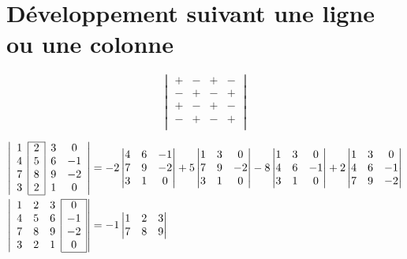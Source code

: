 \part{Développement suivant une ligne ou une colonne}

\begin{exm}
	\[
		\begin{vmatrix}
			+&-&+&-\\
			-&+&-&+\\
			+&-&+&-\\
			-&+&-&+\\
		\end{vmatrix}
	\] 

	\begin{align*}
		\left|
		\begin{array}{c|c|cc}
			\cline{2-2}
			1&2&3&0\\
			4&5&6&-1\\
			7&8&9&-2\\
			3&2&1&0\\\cline{2-2}
		\end{array}
		\right| &= -2 \begin{vmatrix}
			4&6&-1\\
			7&9&-2\\
			3&1&0
		\end{vmatrix}
		+ 5
		\begin{vmatrix}
			1&3&0\\
			7&9&-2\\
			3&1&0
		\end{vmatrix}
		-8
		\begin{vmatrix}
			1&3&0\\
			4&6&-1\\
			3&1&0
		\end{vmatrix} + 2
		\begin{vmatrix}
			1&3&0\\
			4&6&-1\\
			7&9&-2
		\end{vmatrix}\\
		\left|
		\begin{array}{ccc|c|}
			\cline{4-4}
			1&2&3&0\\
			4&5&6&-1\\
			7&8&9&-2\\
			3&2&1&0\\\cline{4-4}
		\end{array}
		\right|
		&= -1
		\begin{vmatrix}
			1&2&3\\
			7&8&9\\

\end{vmatrix}
\end{align*}
\end{exm}
